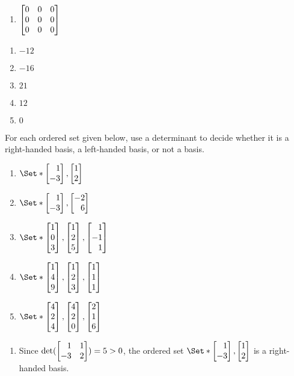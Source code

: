 \begin{exercises}
\begin{problist}
\begin{enumerate}
			\item $\mat{0 & 0 & 0 \\ 0 & 0 & 0 \\ 0 & 0 & 0}$
		\end{enumerate}
        \begin{solution}
        \begin{enumerate}
            \item $-12$
            \item $-16$
            \item $21$
            \item $12$
            \item $0$
        \end{enumerate}
        \end{solution}

		\prob For each ordered set given below, use
		a determinant to decide whether it is a right-handed basis, a left-handed basis,
		or not a basis.
		\begin{enumerate}
			\item $\Set*{\mat{1 \\ -3},\mat{1 \\ 2}}$

			\item $\Set*{\mat{1 \\ -3},\mat{-2 \\ 6}}$

			\item $\Set*{\mat{1 \\ 0 \\ 3},\mat{1 \\ 2 \\ 5},\mat{1 \\ -1 \\ 1}}$

			\item $\Set*{\mat{1 \\ 4 \\ 9},\mat{1 \\ 2 \\ 3},\mat{1 \\ 1 \\ 1}}$

			\item $\Set*{\mat{4 \\ 2 \\ 4},\mat{4 \\ 2 \\ 0},\mat{2 \\ 1 \\ 6}}$
		\end{enumerate}
        \begin{solution}
        \begin{enumerate}
	        \item Since $\det(\mat{1 & 1 \\ -3 & 2})=5>0$, the ordered set
		        $\Set*{\mat{1 \\ -3},\mat{1 \\ 2}}$ is a right-handed basis.


\end{enumerate}
\end{solution}
\end{problist}
\end{exercises}
